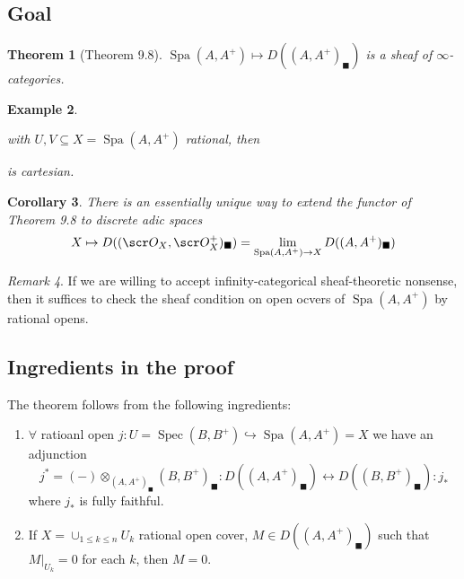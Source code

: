 \documentclass[A4paper, british, reqno]{amsart}
\theoremstyle{darkgreentheorem}
\newtheorem{thm}{Theorem}[section]
\newtheorem{cor}[thm]{Corollary}
\theoremstyle{darkbluedefinition}
\theoremstyle{darkredexample}
\newtheorem{exa}[thm]{Example}
\theoremstyle{remark}
\newtheorem{rem}[thm]{Remark}
\DeclareMathOperator{\Spec}{Spec}
\DeclareMathOperator{\Spa}{Spa}
\newcommand{\1}{\mathbbm{1}}
\newcommand{\ot}{\otimes}
\newcommand{\sub}{\subseteq}
\newcommand{\mono}{\hookrightarrow}
\newcommand{\usolid}{_{\blacksquare}}
\begin{document}
\subsection{Goal}
\begin{thm}[Theorem 9.8]
    $\Spa(A,A^{+})\mapsto D((A,A^{+})\usolid)$ is a sheaf of $\infty$-categories.
\end{thm}

\begin{exa}
    \begin{center}
    \end{center}
    with $U,V\sub X=\Spa(A,A^{+})$ rational, then
    \begin{center}
    \end{center}
    is cartesian.
\end{exa}

\begin{cor}
    There is an essentially unique way to extend the functor of Theorem 9.8 to discrete adic spaces
    \[ X\mapsto D((\O_{X},\O_{X}^{+})\usolid)=\lim_{\Spa(A,A^{+})\to X} D((A,A^{+})\usolid) \]
\end{cor}

\begin{rem}
    If we are willing to accept infinity-categorical sheaf-theoretic nonsense, then it suffices to check the sheaf condition on open ocvers of $\Spa(A,A^{+})$ by rational opens.
\end{rem}

\subsection{Ingredients in the proof}

The theorem follows from the following ingredients:
\begin{enumerate}
    \item $\forall$ ratioanl open $j\colon U=\Spec(B,B^{+})\mono \Spa(A,A^{+})=X$ we have an adjunction
	\[ j^{*}=(-)\ot_{(A,A^{+})\usolid}(B,B^{+})\usolid \colon D((A,A^{+})\usolid)\leftrightarrow D((B,B^{+})\usolid)\colon j_{*} \]
	where $j_{*}$ is fully faithful.
    \item If $X=\cup_{1\leqslant k\leqslant n} U_{k}$ rational open cover, $M\in D((A,A^{+})\usolid)$ such that $M|_{U_{k}}=0$ for each $k$, then $M=0$.
\end{enumerate}
\end{document}
